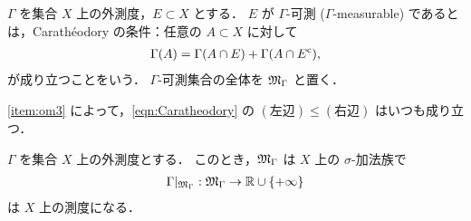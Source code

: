 \begin{definition}
    $\Gamma$ を集合 $X$ 上の外測度，$E\subset X$ とする．
    $E$ が $\Gamma$-可測 ($\Gamma$-measurable) であるとは，Carath\'eodory の条件：任意の $A\subset X$ に対して
    \begin{align}
        \Gamma(A)=\Gamma(A\cap E)+\Gamma(A\cap E^{\mathrm{c}}),
        \label{eqn:Caratheodory}
    \end{align}
    が成り立つことをいう．
    $\Gamma$-可測集合の全体を $\mathfrak{M}_\Gamma$ と置く．
\end{definition}

\begin{remark}
    \ref{item:om3} によって，\eqref{eqn:Caratheodory} の $(\text{左辺})\le(\text{右辺})$ はいつも成り立つ．
\end{remark}

\begin{theorem}\label{thm:outer_measure_to_measure}
    $\Gamma$ を集合 $X$ 上の外測度とする．
    このとき，$\mathfrak{M}_\Gamma$ は $X$ 上の $\sigma$-加法族で
    \begin{align*}
        \Gamma\vert_{\mathfrak{M}_\Gamma}:\mathfrak{M}_\Gamma\to\mathbb{R}\cup\{+\infty\}
    \end{align*}
    は $X$ 上の測度になる．
\end{theorem}

